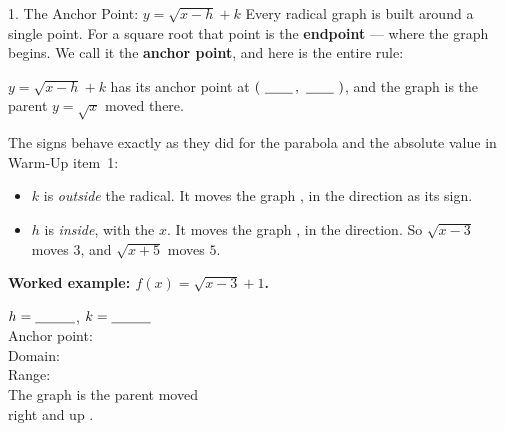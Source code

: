 \documentclass[10pt]{article}
\newcommand{\lgrid}[4]{%
  \draw[step=1, linegray!40, very thin] (#1,#3) grid (#2,#4);
  \draw[->, semithick, charcoal] (#1,0)--(#2,0) node[below right, font=\scriptsize]{$x$};
  \draw[->, semithick, charcoal] (0,#3)--(0,#4) node[left, font=\scriptsize]{$y$};}
\begin{document}
\begin{notesbox}{1. The Anchor Point: $y=\sqrt{x-h}+k$}
Every radical graph is built around a single point. For a square root that point is the
\textbf{endpoint} --- where the graph begins. We call it the \textbf{anchor point}, and here is the
entire rule:
\begin{center}
\begin{tcolorbox}[colback=goldbg, colframe=goldacc, boxrule=0.8pt, arc=1.5mm, width=0.92\linewidth,
    left=3mm, right=3mm, top=2mm, bottom=2mm]
\centering
$y=\sqrt{x-h}+k$ \quad has its anchor point at \quad $(\ \blank{0.7cm}\,,\ \blank{0.7cm}\ )$,
\quad and the graph is the parent $y=\sqrt{x}$ moved there.
\end{tcolorbox}
\end{center}
The signs behave exactly as they did for the parabola and the absolute value in Warm-Up item~1:
\begin{itemize}[leftmargin=1.5em, itemsep=3pt]
  \item $k$ is \emph{outside} the radical. It moves the graph \blank{2.2cm}, in the
        \blank{2.2cm} direction as its sign.
  \item $h$ is \emph{inside}, with the $x$. It moves the graph \blank{2.2cm}, in the
        \blank{2.2cm} direction. So $\sqrt{x-3}$ moves \blank{1.6cm} $3$, and $\sqrt{x+5}$
        moves \blank{1.6cm} $5$.
\end{itemize}

\vspace{3pt}
\textbf{Worked example: $f(x)=\sqrt{x-3}+1$.}
\begin{center}
\begin{minipage}[c]{0.52\linewidth}
\centering
{}
\end{minipage}
\begin{minipage}[c]{0.44\linewidth}
\small
$h=\blank{1.0cm}$, \quad $k=\blank{1.0cm}$ \\[4pt]
Anchor point: \blank{2.0cm} \\[4pt]
Domain: \blank{2.4cm} \\[4pt]
Range: \blank{2.4cm} \\[4pt]
The graph is the parent moved \\ right \blank{0.8cm} and up \blank{0.8cm}.
\end{minipage}
\end{center}


\end{notesbox}
\end{document}

